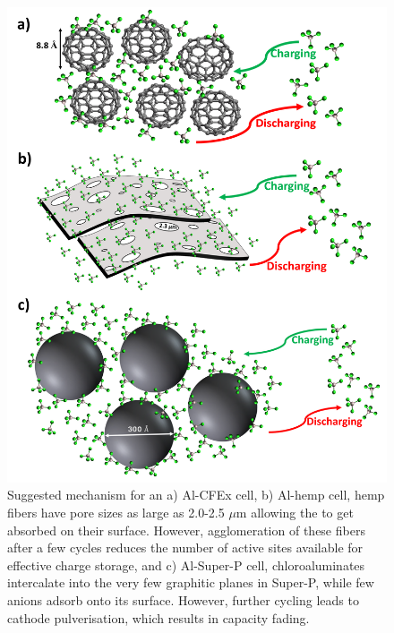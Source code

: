  \begin{figure}[h!]
  \centering
  \includegraphics[width=\textwidth]{Figures/chap5fig/allmech}
    \caption{Suggested mechanism for an a) Al-CFEx cell, b) Al-hemp cell, hemp fibers have pore sizes as large as 2.0-2.5 $\mu$m allowing the  to get absorbed on their surface. However, agglomeration of these fibers after a few cycles reduces the number of active sites available for effective charge storage, and c) Al-Super-P cell, chloroaluminates intercalate into the very few graphitic planes in Super-P, while few anions adsorb onto its surface. However, further cycling leads to cathode pulverisation, which results in capacity fading. }
  \label{Figures/chap5figs:allmech}
\end{figure}

